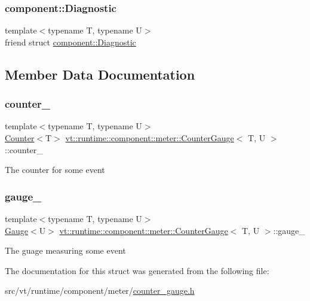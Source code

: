 \subsubsection{\texorpdfstring{component\+::\+Diagnostic}{component::Diagnostic}}
{\footnotesize\ttfamily template$<$typename T, typename U$>$ \\
friend struct \hyperlink{structvt_1_1runtime_1_1component_1_1_diagnostic}{component\+::\+Diagnostic}\hspace{0.3cm}{\ttfamily [friend]}}



\subsection{Member Data Documentation}
\mbox{\label{structvt_1_1runtime_1_1component_1_1meter_1_1_counter_gauge_a633dac04bd7b420a158ce12e36afb320}} 
\subsubsection{\texorpdfstring{counter\+\_\+}{counter\_}}
{\footnotesize\ttfamily template$<$typename T, typename U$>$ \\
\hyperlink{structvt_1_1runtime_1_1component_1_1meter_1_1_counter}{Counter}$<$T$>$ \hyperlink{structvt_1_1runtime_1_1component_1_1meter_1_1_counter_gauge}{vt\+::runtime\+::component\+::meter\+::\+Counter\+Gauge}$<$ T, U $>$\+::counter\+\_\+\hspace{0.3cm}{\ttfamily [private]}}

The counter for some event \mbox{\label{structvt_1_1runtime_1_1component_1_1meter_1_1_counter_gauge_a76c78392b6cc713038031300eb00e86c}} 
\subsubsection{\texorpdfstring{gauge\+\_\+}{gauge\_}}
{\footnotesize\ttfamily template$<$typename T, typename U$>$ \\
\hyperlink{structvt_1_1runtime_1_1component_1_1meter_1_1_gauge}{Gauge}$<$U$>$ \hyperlink{structvt_1_1runtime_1_1component_1_1meter_1_1_counter_gauge}{vt\+::runtime\+::component\+::meter\+::\+Counter\+Gauge}$<$ T, U $>$\+::gauge\+\_\+\hspace{0.3cm}{\ttfamily [private]}}

The guage measuring some event 

The documentation for this struct was generated from the following file\+:\begin{DoxyCompactItemize}
\item 
src/vt/runtime/component/meter/\hyperlink{counter__gauge_8h}{counter\+\_\+gauge.\+h}\end{DoxyCompactItemize}
